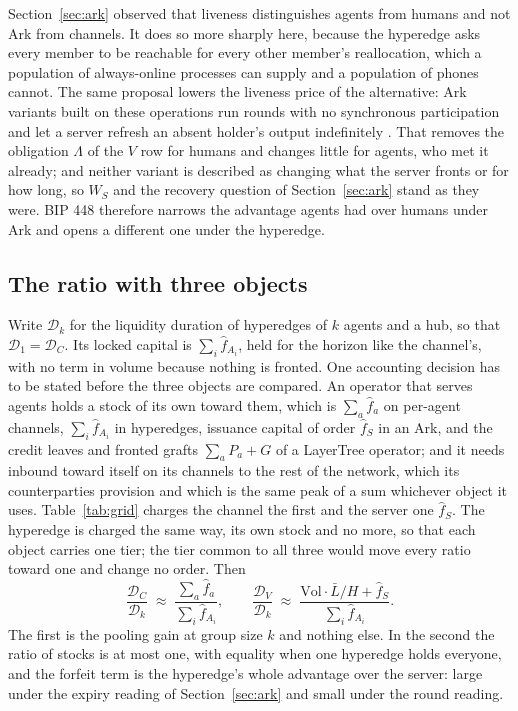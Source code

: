 \documentclass[11pt]{article}
\theoremstyle{plain}
\theoremstyle{definition}
\theoremstyle{remark}
\newcommand{\Dur}{\mathcal{D}}
\begin{document}
Section~\ref{sec:ark} observed that liveness distinguishes agents from humans and not Ark from channels. It does so more sharply here, because the hyperedge asks every member to be reachable for every other member's reallocation, which a population of always-online processes can supply and a population of phones cannot. The same proposal lowers the liveness price of the alternative: Ark variants built on these operations run rounds with no synchronous participation and let a server refresh an absent holder's output indefinitely \citep{roose2025erk}. That removes the obligation $\Lambda$ of the $V$ row for humans and changes little for agents, who met it already; and neither variant is described as changing what the server fronts or for how long, so $W_S$ and the recovery question of Section~\ref{sec:ark} stand as they were. BIP 448 therefore narrows the advantage agents had over humans under Ark and opens a different one under the hyperedge.

\subsection{The ratio with three objects}
\label{sec:hratio}

Write $\Dur_k$ for the liquidity duration of hyperedges of $k$ agents and a hub, so that $\Dur_1=\Dur_C$. Its locked capital is $\sum_i\hat f_{A_i}$, held for the horizon like the channel's, with no term in volume because nothing is fronted. One accounting decision has to be stated before the three objects are compared. An operator that serves agents holds a stock of its own toward them, which is $\sum_a\hat f_a$ on per-agent channels, $\sum_i\hat f_{A_i}$ in hyperedges, issuance capital of order $\hat f_S$ in an Ark, and the credit leaves and fronted grafts $\sum_a P_a+G$ of a LayerTree operator; and it needs inbound toward itself on its channels to the rest of the network, which its counterparties provision and which is the same peak of a sum whichever object it uses. Table~\ref{tab:grid} charges the channel the first and the server one $\hat f_S$. The hyperedge is charged the same way, its own stock and no more, so that each object carries one tier; the tier common to all three would move every ratio toward one and change no order. Then
\begin{equation}
\frac{\Dur_C}{\Dur_k}\;\approx\;\frac{\sum_a\hat f_a}{\sum_i\hat f_{A_i}},
\qquad
\frac{\Dur_V}{\Dur_k}\;\approx\;\frac{\mathrm{Vol}\cdot\bar L/H+\hat f_S}{\sum_i\hat f_{A_i}}.
\label{eq:hratio}
\end{equation}
The first is the pooling gain at group size $k$ and nothing else. In the second the ratio of stocks is at most one, with equality when one hyperedge holds everyone, and the forfeit term is the hyperedge's whole advantage over the server: large under the expiry reading of Section~\ref{sec:ark} and small under the round reading.
\end{document}
